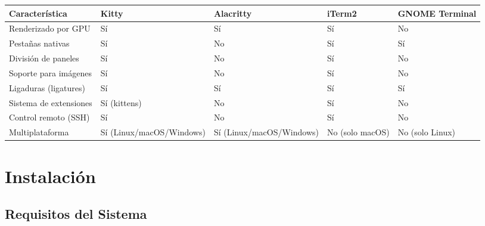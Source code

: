 \documentclass[
  doc,
  floatsintext,
  longtable,
  a4paper,
  nolmodern,
  notxfonts,
  notimes,
  12pt,
  colorlinks=true,linkcolor=blue,citecolor=blue,urlcolor=blue]{apa7}
\newcounter{none} %
\begin{document}
{\def\LTcaptype{none} %
\begin{longtable}[]{@{}
  >{\raggedright\arraybackslash}p{}
  >{\raggedright\arraybackslash}p{}
  >{\raggedright\arraybackslash}p{}
  >{\raggedright\arraybackslash}p{}
  >{\raggedright\arraybackslash}p{}@{}}
\toprule\noalign{}
\begin{minipage}[b]{\linewidth}\raggedright
Característica
\end{minipage} & \begin{minipage}[b]{\linewidth}\raggedright
Kitty
\end{minipage} & \begin{minipage}[b]{\linewidth}\raggedright
Alacritty
\end{minipage} & \begin{minipage}[b]{\linewidth}\raggedright
iTerm2
\end{minipage} & \begin{minipage}[b]{\linewidth}\raggedright
GNOME Terminal
\end{minipage} \\
\midrule\noalign{}
\endhead
\bottomrule\noalign{}
\endlastfoot
Renderizado por GPU & Sí & Sí & Sí & No \\
Pestañas nativas & Sí & No & Sí & Sí \\
División de paneles & Sí & No & Sí & No \\
Soporte para imágenes & Sí & No & Sí & No \\
Ligaduras (ligatures) & Sí & Sí & Sí & Sí \\
Sistema de extensiones & Sí (kittens) & No & Sí & No \\
Control remoto (SSH) & Sí & No & Sí & No \\
Multiplataforma & Sí (Linux/macOS/Windows) & Sí (Linux/macOS/Windows) &
No (solo macOS) & No (solo Linux) \\
\end{longtable}
}

\section{Instalación}\label{instalaciuxf3n}

\subsection{Requisitos del Sistema}\label{requisitos-del-sistema}
\end{document}
